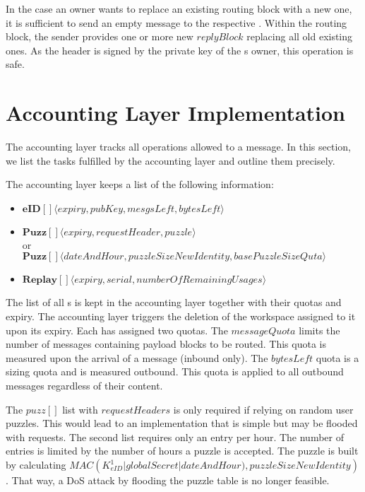 In the case an owner wants to replace an existing routing block with a new one, it is sufficient to send an empty message to the respective . Within the routing block, the sender provides one or more new $replyBlock$ replacing all old existing ones. As the header is signed by the private key of the s owner, this operation is safe.

\chapter{Accounting Layer Implementation}\label{sec:accountingImplementation}
The accounting layer tracks all operations allowed to a message. In this section, we list the tasks fulfilled by the accounting layer and outline them precisely.

The accounting layer keeps a list of the following information:
\begin{itemize}
	\item $\mathbf{eID[]}\langle expiry, pubKey, mesgsLeft, bytesLeft \rangle$\\
	\item $\mathbf{Puzz[]}\langle expiry, requestHeader, puzzle \rangle$\\
	or\\
	$\mathbf{Puzz[]}\langle dateAndHour, puzzleSizeNewIdentity, basePuzzleSizeQuta \rangle$\\
	\item $\mathbf{Replay[]}\langle expiry, serial, numberOfRemainingUsages \rangle$\\
\end{itemize}

The list of all s is kept in the accounting layer together with their quotas and expiry. The accounting layer triggers the deletion of the workspace assigned to it upon its expiry. Each  has assigned two quotas. The $messageQuota$ limits the number of messages containing payload blocks to be routed. This quota is measured upon the arrival of a message (inbound only). The $bytesLeft$ quota is a sizing quota and is measured outbound. This quota is applied to all outbound messages regardless of their content.

The $puzz[]$ list with $requestHeaders$ is only required if relying on random user puzzles. This would lead to an implementation that is simple but may be flooded with  requests. The second list requires only an entry per hour. The number of entries is limited by the number of hours a puzzle is accepted. The puzzle is built by calculating  $MAC\left(K^1_{eID} | globalSecret | dateAndHour ), puzzleSizeNewIdentity\right)$. That way, a DoS attack by flooding the puzzle table is no longer feasible.

